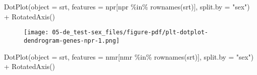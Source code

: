 \documentclass[
  letterpaper,
  DIV=11,
  numbers=noendperiod]{scrartcl}
\newenvironment{Shaded}{\begin{snugshade}}{\end{snugshade}}
\newcommand{\AttributeTok}[1]{\textcolor[rgb]{0.40,0.45,0.13}{#1}}
\newcommand{\ConstantTok}[1]{\textcolor[rgb]{0.56,0.35,0.01}{#1}}
\newcommand{\DecValTok}[1]{\textcolor[rgb]{0.68,0.00,0.00}{#1}}
\newcommand{\FloatTok}[1]{\textcolor[rgb]{0.68,0.00,0.00}{#1}}
\newcommand{\FunctionTok}[1]{\textcolor[rgb]{0.28,0.35,0.67}{#1}}
\newcommand{\NormalTok}[1]{\textcolor[rgb]{0.00,0.23,0.31}{#1}}
\newcommand{\SpecialCharTok}[1]{\textcolor[rgb]{0.37,0.37,0.37}{#1}}
\newcommand{\StringTok}[1]{\textcolor[rgb]{0.13,0.47,0.30}{#1}}
\begin{document}
\begin{Shaded}
\end{Shaded}

\begin{Shaded}
\begin{Highlighting}[]
\FunctionTok{DotPlot}\NormalTok{(}\AttributeTok{object =}\NormalTok{ srt, }\AttributeTok{features =}\NormalTok{ npr[npr }\SpecialCharTok{\%in\%} \FunctionTok{rownames}\NormalTok{(srt)], }\AttributeTok{split.by =} \StringTok{"sex"}\NormalTok{) }\SpecialCharTok{+} \FunctionTok{RotatedAxis}\NormalTok{()}
\end{Highlighting}
\end{Shaded}

\begin{figure}[H]

{\centering \texttt{[image: 05-de\_test-sex\_files/figure-pdf/plt-dotplot-dendrogram-genes-npr-1.png]}

}

\end{figure}

\begin{Shaded}
\begin{Highlighting}[]
\FunctionTok{DotPlot}\NormalTok{(}\AttributeTok{object =}\NormalTok{ srt, }\AttributeTok{features =}\NormalTok{ nmr[nmr }\SpecialCharTok{\%in\%} \FunctionTok{rownames}\NormalTok{(srt)], }\AttributeTok{split.by =} \StringTok{"sex"}\NormalTok{) }\SpecialCharTok{+} \FunctionTok{RotatedAxis}\NormalTok{()}
\end{Highlighting}
\end{Shaded}
\end{document}
